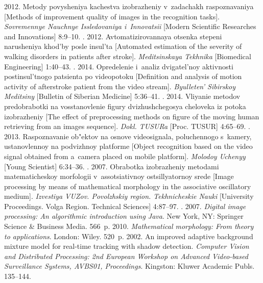 \begin{multicols}{2}
{{\begin{thebibliography}{99}
2012. Metody povysheniya kachestva izob\-ra\-zhe\-niy v~zadachakh raspoznavaniya
[Methods of improvement quality of images in the recognition tasks].
\textit{Sovremennye Nauchnye Issledovaniya i~Innovatsii}
[Modern Scientific Researches and Innovations] 8:9--10.
.
2012. Avtomatizirovannaya otsenka stepeni narusheniya khod'by posle insul'ta
[Automated estimation of the severity of walking disorders in patients
after stroke]. \textit{Meditsinskaya Tekhnika} [Biomedical Engineering] 1:40--43.
. 2014.
Opredelenie i~analiz dvigatel'noy aktivnosti postinsul'tnogo patsienta po
videopotoku [Definition and analysis of motion activity of afterstroke patient
from the video stream]. \textit{Byulleten' Sibirskoy Meditsiny}
[Bulletin of Siberian Medicine] 5:36--41.
. 2014.
Vliyanie metodov predobrabotki na vosstanovlenie figury dvi\-zhu\-shche\-go\-sya cheloveka
iz potoka izobrazheniy [The effect of preprocessing methods on figure
of the moving human retrieving from an images sequence].
\textit{Dokl. TUSURa} [Proc. TUSUR] 4:65--69.
. 2013.
Raspoznavanie ob"ektov na osnove videosignala, poluchennogo
s~kamery, ustanovlennoy na podvizhnoy platforme
[Object recognition based on the video signal obtained from a~camera
placed on mobile platform]. \textit{Molodoy Uchenyy} [Young Scientist] 6:34--36.
. 2007. Obrabotka izob\-ra\-zhe\-niy metodami
matematicheskoy morfologii v~assotsiativnoy ostsillyatornoy srede
[Image processing by means of mathematical morphology in the associative
oscillatory medium]. \textit{Izvestiya VUZov. Povolzhskiy region.
Tekh\-ni\-che\-skie Nauki} [University Proceedings. Volga Region. Technical Sciences]
4:87--97.
. 2007.
\textit{Digital image processing: An algorithmic introduction using Java}.
New York, NY: Springer Science \& Business Media. 566~p.
 2010. \textit{Mathematical morphology:
From theory to applications}. London: Wiley. 520~p.
 2002.
An improved adaptive background mixture model
for real-time tracking with shadow detection.
\textit{Computer
Vision and Distributed Processing:  2nd European Workshop on Advanced
Video-based Surveillance Systems, AVBS01, Proceedings}.
 Kingston: Kluwer Academic Publs. 135--144.


\end{thebibliography}

 }
 }

\end{multicols}

